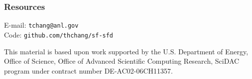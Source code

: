 \documentclass[aspectratio=169]{beamer}
\begin{document}
\begin{frame}\frametitle{Resources}
\begin{center}
{\large
E-mail: {\tt tchang@anl.gov}}\\
\bigskip
\bigskip
Code: {\tt github.com/thchang/sf-sfd}\\

\bigskip
\bigskip

{\small This material is based upon work supported by the U.S. Department of Energy, Office of Science, Office of Advanced Scientific Computing Research, SciDAC program under contract number DE-AC02-06CH11357.}
\end{center}
\end{frame}
\end{document}

